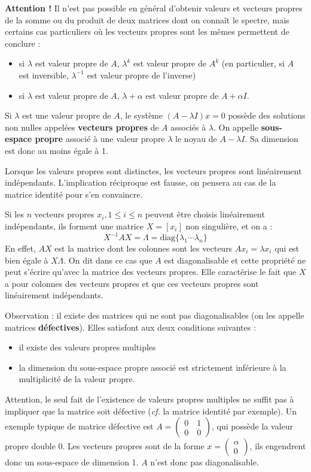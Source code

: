 \textbf{Attention !} Il n'est pas possible en général d'obtenir valeurs et vecteurs propres de la somme ou du produit de deux matrices dont on connaît le spectre, mais certains cas particuliers où les vecteurs propres sont les mêmes permettent de conclure :
\begin{itemize}
	\item si $\lambda$ est valeur propre de $A$,  $\lambda^k$ est valeur propre de $A^k$ (en particulier, si $A$ est inversible, $\lambda^{-1}$ est valeur propre de l'inverse)
	\item  si $\lambda$ est valeur propre de $A$, $\lambda+\alpha$ est valeur propre de $A+\alpha I$.
\end{itemize}
\vskip 10pt
Si $\lambda$ est une valeur propre de $A$, le système $(A-\lambda I)x=0$ possède des solutions non nulles appelées \textbf{vecteurs propres} 
de $A$ associés à $\lambda$. On appelle \textbf{sous-espace propre} 
associé à une valeur propre $\lambda$ le noyau de $A-\lambda I$. Sa dimension est donc au moins égale à 1.

Lorsque les valeurs propres sont distinctes, les vecteurs propres sont linéairement indépendants. L'implication réciproque est fausse, on pensera au cas de la matrice identité pour s'en 
convaincre.

Si les $n$ vecteurs propres $x_i,1\leq i\leq n$ peuvent être choisis linéairement indépendants, ils forment une matrice $X=\left [ x_i\right ]$ non singulière, et on a :
$$
X^{-1}AX=\Lambda=\mathrm{diag}\{\lambda_1\cdots\lambda_n\}
$$
En effet, $AX$ est la matrice dont les colonnes sont les vecteurs $Ax_i=\lambda x_i$ qui est bien égale à $X\Lambda$. On dit dans ce cas que {\gr $A$ est diagonalisable}
et cette propriété ne peut s'écrire qu'avec la matrice des vecteurs propres. 
Elle caractérise le fait que $X$ a pour colonnes des vecteurs propres et que ces vecteurs 
propres sont linéairement indépendants.


Observation : il existe des matrices qui ne sont pas diagonalisables (on les appelle 
matrices \textbf{défectives}). Elles satisfont aux deux conditions 
suivantes :
\begin{itemize}
	\item il existe des valeurs propres multiples
	\item  la dimension du sous-espace propre associé est strictement inférieure à la multiplicité de la valeur propre.
\end{itemize}
Attention, le seul fait de l'existence de valeurs propres multiples ne suffit pas à impliquer que la matrice soit défective ({\it cf.} la matrice identité par exemple).
Un exemple typique de matrice défective est $A=\begin{pmatrix} 0\quad 1\\0\quad 0\end{pmatrix}$, qui possède la valeur propre double 0. Les vecteurs propres sont de la forme $x=\begin{pmatrix}\alpha\\0\end{pmatrix}$, ils engendrent donc un sous-espace de dimension 1. $A$ n'est donc pas diagonalisable.

